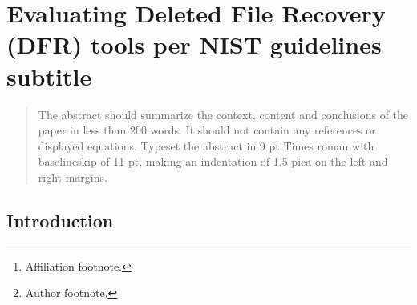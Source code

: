 \documentclass{ws-rv9x6}
\begin{document}
\chapter[Evaluating Deleted File Recovery (DFR) tools per NIST guidelines]{Evaluating Deleted File Recovery (DFR) tools per NIST guidelines\\ subtitle\label{ra_ch1}}

\author[F. Author and S. Author]{First Author and Second Author\footnote{Author footnote.}}

\address{CS Department, BGSU,\\
Bowling Green, Ohio, USA 43403, \\
f\_author@bgsu.edu\footnote{Affiliation footnote.}}

\begin{abstract}
The abstract should summarize the context, content and conclusions of
the paper in less than 200 words. It should not contain any references
or displayed equations. Typeset the abstract in 9 pt Times roman with
baselineskip of 11 pt, making an indentation of 1.5 pica on the left
and right margins.
\end{abstract}


\body


\section{Introduction}\label{intro}
\end{document}

